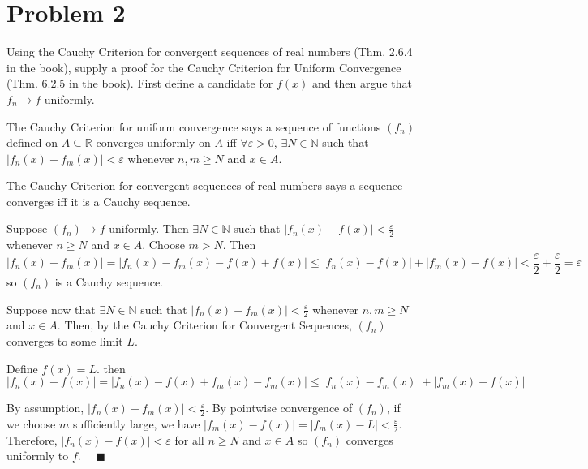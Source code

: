 \documentclass[12pt]{article}
\newcommand{\R}{\mathbb{R}}
\newcommand{\N}{\mathbb{N}}
\newcommand{\qed}{\quad \blacksquare}
\newcommand{\abs}[1]{\left\vert #1 \right\vert}
\newcommand{\ep}{\varepsilon}
\begin{document}
\pagebreak


\section*{Problem 2 }
Using the Cauchy Criterion for convergent sequences of real numbers (Thm. 2.6.4 in the book), supply a proof for the Cauchy Criterion for Uniform Convergence (Thm. 6.2.5 in the book). First define a candidate for $f(x)$ and then argue that $f_n\to f$ uniformly.

    \color{blue}
        The Cauchy Criterion for uniform convergence says a sequence of functions $(f_n)$ defined on $A \subseteq \R$ converges uniformly on $A$ iff $\forall \ep > 0$, $\exists N \in \N$ such that $\abs{f_n(x) - f_m(x)} < \ep$ whenever $n, m \geq N$ and $x \in A$.

        The Cauchy Criterion for convergent sequences of real numbers says a sequence converges iff it is a Cauchy sequence. 
        
        Suppose $(f_n) \to f$ uniformly. Then $\exists N \in \N$ such that $\abs{f_n(x) - f(x)} < \frac{\ep}{2}$ whenever $n \geq N$ and $x \in A$. Choose $m > N$. Then 
        \[\abs{f_n(x) - f_m(x)} = \abs{f_n(x) - f_m(x) - f(x) + f(x)} \leq \abs{f_n(x) - f(x)} + \abs{f_m(x) - f(x)} < \frac{\ep}{2} + \frac{\ep}{2} = \ep\] 
        so $(f_n)$ is a Cauchy sequence.

        Suppose now that $\exists N \in \N$ such that $\abs{f_n(x) - f_m(x)} < \frac{\ep}{2}$ whenever $n, m \geq N$ and $x \in A$. Then, by the Cauchy Criterion for Convergent Sequences, $(f_n)$ converges to some limit $L$. 
        
        Define $f(x) = L$. then 
        \[\abs{f_n(x) - f(x)} = \abs{f_n(x) - f(x) + f_m(x) - f_m(x)} \leq \abs{f_n(x) - f_m(x)} + \abs{f_m(x) - f(x)}\]

        By assumption, $\abs{f_n(x) - f_m(x)} < \frac{\ep}{2}$. By pointwise convergence of $(f_n)$, if we choose $m$ sufficiently large, we have $\abs{f_m(x) - f(x)} = \abs{f_m(x) - L} < \frac{\ep}{2}$. Therefore, $\abs{f_n(x) - f(x)} < \ep$ for all $n \geq N$ and $x \in A$ so $(f_n)$ converges uniformly to $f$. $\qed$
    \color{black}


\pagebreak
\end{document}
